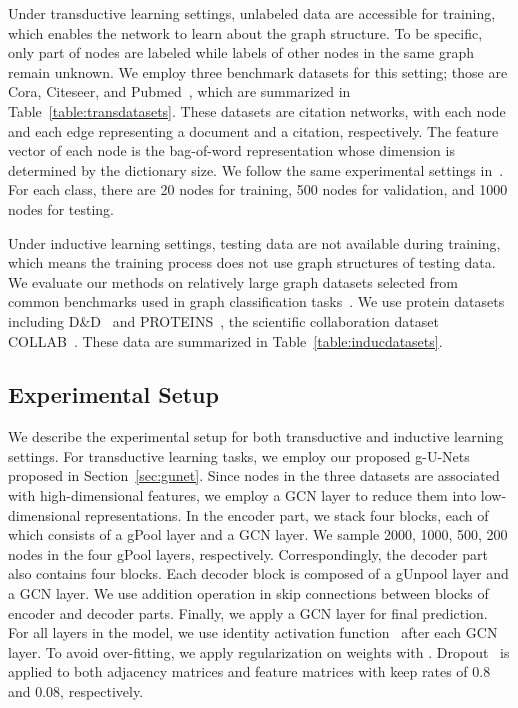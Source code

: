 \documentclass{article}
\begin{document}
Under transductive learning settings,
unlabeled data are accessible for training, which enables the
network to learn about the graph structure. To be specific, only
part of nodes are labeled while labels of other nodes in the same
graph remain unknown. We employ three benchmark datasets for this
setting; those are Cora, Citeseer, and Pubmed~\citep{kipf2016semi},
which are summarized in Table~\ref{table:transdatasets}. These datasets
are citation networks, with each node and each edge representing a
document and a citation, respectively. The feature vector of each
node is the bag-of-word representation whose dimension is determined
by the dictionary size. We follow the same experimental settings
in~\citep{kipf2016semi}. For each class, there are 20 nodes for
training, 500 nodes for validation, and 1000 nodes for testing.

Under inductive learning settings, testing data are
not available during training, which means the training process does
not use graph structures of testing data. We evaluate our methods on
relatively large graph datasets selected from common benchmarks used
in graph classification
tasks~\citep{ying2018hierarchical,niepert2016learning,zhang2018end}.
We use protein datasets including
D\&D~\citep{dobson2003distinguishing} and
PROTEINS~\citep{borgwardt2005protein}, the scientific collaboration
dataset COLLAB~\citep{yanardag2015structural}. These data are
summarized in Table~\ref{table:inducdatasets}.

\subsection{Experimental Setup}



We describe the experimental setup for both transductive and inductive
learning settings. For transductive learning tasks, we employ our proposed
g-U-Nets proposed in Section~\ref{sec:gunet}. Since nodes in the three
datasets are associated with high-dimensional features, we employ a GCN layer
to reduce them into low-dimensional representations. In the encoder part, we
stack four blocks, each of which consists of a gPool layer and a GCN layer. We
sample 2000, 1000, 500, 200 nodes in the four gPool layers, respectively.
Correspondingly, the decoder part also contains four blocks. Each decoder
block is composed of a gUnpool layer and a GCN layer. We use addition
operation in skip connections between blocks of encoder and decoder parts.
Finally, we apply a GCN layer for final prediction. For all layers in the
model, we use identity activation function~\cite{gao2018large} after each
GCN layer. To avoid
over-fitting, we apply  regularization on weights with .
Dropout~\citep{srivastava2014dropout} is applied to both adjacency matrices
and feature matrices with keep rates of 0.8 and 0.08, respectively.
\end{document}

